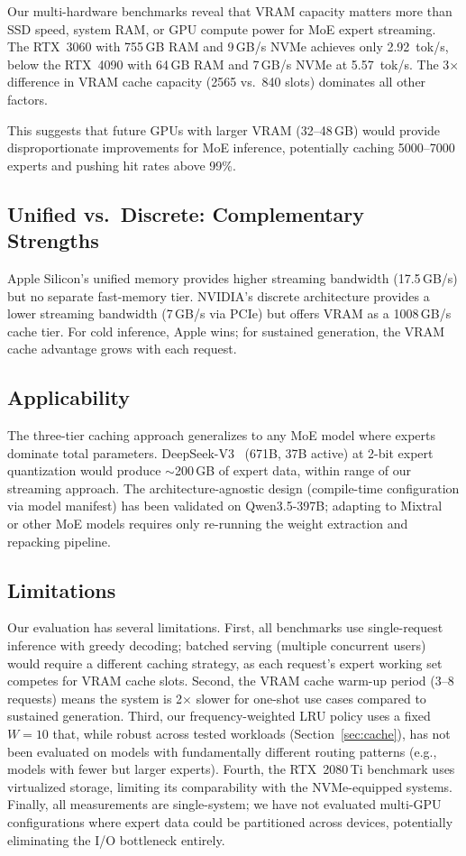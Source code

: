 \documentclass[11pt]{article}
\begin{document}
Our multi-hardware benchmarks reveal that VRAM capacity matters more than SSD speed, system RAM, or GPU compute power for MoE expert streaming. The RTX~3060 with 755\,GB RAM and 9\,GB/s NVMe achieves only 2.92~tok/s, below the RTX~4090 with 64\,GB RAM and 7\,GB/s NVMe at 5.57~tok/s. The 3$\times$ difference in VRAM cache capacity (2565 vs.\ 840 slots) dominates all other factors.

This suggests that future GPUs with larger VRAM (32--48\,GB) would provide disproportionate improvements for MoE inference, potentially caching 5000--7000 experts and pushing hit rates above 99\%.

\subsection{Unified vs.\ Discrete: Complementary Strengths}

Apple Silicon's unified memory provides higher streaming bandwidth (17.5\,GB/s) but no separate fast-memory tier. NVIDIA's discrete architecture provides a lower streaming bandwidth (7\,GB/s via PCIe) but offers VRAM as a 1008\,GB/s cache tier. For cold inference, Apple wins; for sustained generation, the VRAM cache advantage grows with each request.

\subsection{Applicability}

The three-tier caching approach generalizes to any MoE model where experts dominate total parameters. DeepSeek-V3~\cite{deepseekv3} (671B, 37B active) at 2-bit expert quantization would produce $\sim$200\,GB of expert data, within range of our streaming approach. The architecture-agnostic design (compile-time configuration via model manifest) has been validated on Qwen3.5-397B; adapting to Mixtral~\cite{mixtral} or other MoE models requires only re-running the weight extraction and repacking pipeline.

\subsection{Limitations}

Our evaluation has several limitations. First, all benchmarks use single-request inference with greedy decoding; batched serving (multiple concurrent users) would require a different caching strategy, as each request's expert working set competes for VRAM cache slots. Second, the VRAM cache warm-up period (3--8 requests) means the system is 2$\times$ slower for one-shot use cases compared to sustained generation. Third, our frequency-weighted LRU policy uses a fixed $W=10$ that, while robust across tested workloads (Section~\ref{sec:cache}), has not been evaluated on models with fundamentally different routing patterns (e.g., models with fewer but larger experts). Fourth, the RTX~2080\,Ti benchmark uses virtualized storage, limiting its comparability with the NVMe-equipped systems. Finally, all measurements are single-system; we have not evaluated multi-GPU configurations where expert data could be partitioned across devices, potentially eliminating the I/O bottleneck entirely.
\end{document}
